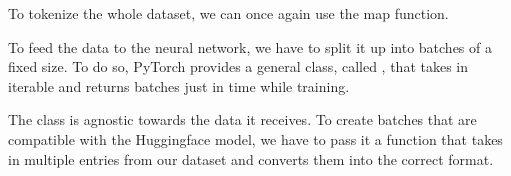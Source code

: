 \documentclass[letterpaper,10pt,english]{jupyterBook}
\begin{document}
\sphinxAtStartPar
To tokenize the whole dataset, we can once again use the map function.
\begin{sphinxVerbatimInput}

\begin{sphinxVerbatim}[commandchars=\\\{\}]
    
     
         \PYG{p}{[}\PYG{p}{]}  
     

  

   
\PYG{p}{[}\PYG{p}{]}\PYG{p}{[}\PYG{p}{]}
\end{sphinxVerbatim}
\end{sphinxVerbatimInput}

\sphinxAtStartPar
To feed the data to the neural network, we have to split it up into batches of a fixed size.
To do so, PyTorch provides a general class, called , that takes in iterable and returns batches just in time while training.

\sphinxAtStartPar
The  class is agnostic towards the data it receives. To create batches that are compatible with the Huggingface model, we have to pass it a function that takes in multiple entries from our dataset and converts them into the correct format.
\end{document}
